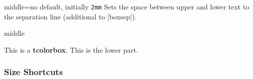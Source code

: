 \begin{docTcbKey}{middle}{=}{no default, initially \texttt{2mm}}
  Sets the space between upper and lower text to the separation line
  (additional to |boxsep|).
\begin{exdispExample}{middle}

\begin{tcolorbox}[middle=0mm,boxsep=0mm]
This is a \textbf{tcolorbox}.
\tcblower
This is the lower part.
\end{tcolorbox}
\end{exdispExample}
\end{docTcbKey}


\clearpage
\subsubsection{Size Shortcuts}
